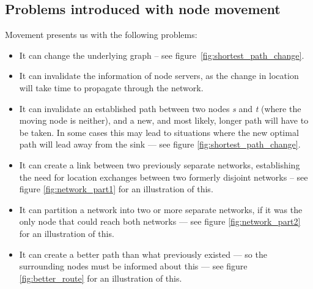 \subsection{Problems introduced with node movement}


Movement presents us with the following problems:



\begin{itemize}
\item It can change the underlying graph -- see figure~\ref{fig:shortest_path_change}.
\item It can invalidate the information of node servers, as the change in location will take time to propagate through the network.
\item It can invalidate an established path between two nodes \emph{s} and \emph{t} (where the moving node is neither), and a new, and most likely, longer path will have to be taken. In some cases this may lead to situations where the new optimal path will lead away from the sink --- see figure \ref{fig:shortest_path_change}.
\item It can create a link between two previously separate networks, establishing the need for location exchanges between two formerly disjoint networks -- see figure \ref{fig:network_part1} for an illustration of this.
\item It can partition a network into two or more separate networks, if it was the only node that could reach both networks --- see figure \ref{fig:network_part2} for an illustration of this.
\item It can create a better path than what previously existed --- so the surrounding nodes must be informed about this --- see figure \ref{fig:better_route} for an illustration of this.
\end{itemize}


